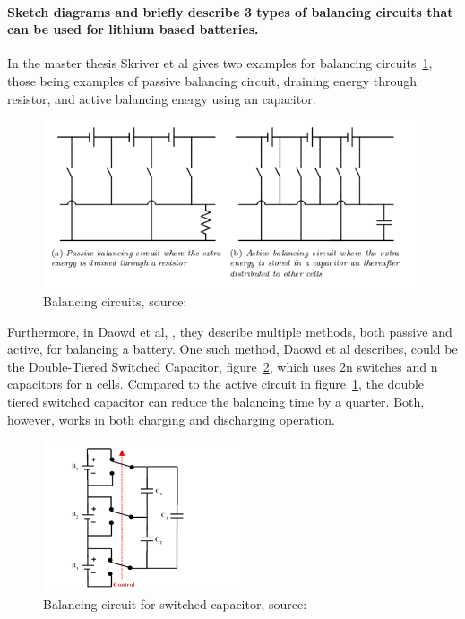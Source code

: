 \documentclass[paper=letter, fontsize=10pt]{article}
\begin{document}
\paragraph{Sketch diagrams and briefly describe 3 types of balancing circuits that can be used for lithium based batteries.}
In the master thesis Skriver et al \cite{master_thesis} gives two examples for balancing circuits~\ref{fig_circuits}, those being examples of passive balancing circuit, draining energy through resistor, and active balancing energy using an capacitor.
\begin{figure}
\centering
\includegraphics[scale=0.8]{Figures/balancecircuit}
\caption{Balancing circuits, source: \cite{master_thesis}}
\label{fig_circuits}
\end{figure}

Furthermore, in Daowd et al, \cite{balancing}, they describe multiple methods, both passive and active, for balancing a battery. 
One such method, Daowd et al describes, could be the Double-Tiered Switched Capacitor, figure~\ref{fig_capacitor}, which uses 2n switches and n capacitors for n cells. Compared to the active circuit in figure~\ref{fig_circuits}, the double tiered switched capacitor can reduce the balancing time by a quarter. Both, however, works in both charging and discharging operation.

\begin{figure}[H]
\centering
\includegraphics[scale=0.8]{Figures/capacitor}
\caption{Balancing circuit for switched capacitor, source: \cite{balancing}}
\label{fig_capacitor}
\end{figure}
\end{document}
